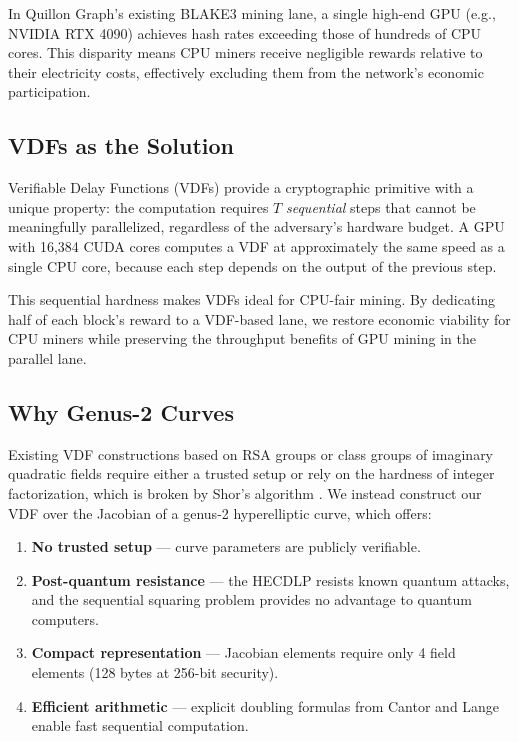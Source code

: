 \documentclass[11pt,a4paper]{article}
\begin{document}
In Quillon Graph's existing BLAKE3 mining lane, a single high-end GPU (e.g., NVIDIA RTX 4090) achieves hash rates exceeding those of hundreds of CPU cores. This disparity means CPU miners receive negligible rewards relative to their electricity costs, effectively excluding them from the network's economic participation.

\subsection{VDFs as the Solution}

Verifiable Delay Functions (VDFs) \cite{boneh2018} provide a cryptographic primitive with a unique property: the computation requires $T$ \emph{sequential} steps that cannot be meaningfully parallelized, regardless of the adversary's hardware budget. A GPU with 16,384 CUDA cores computes a VDF at approximately the same speed as a single CPU core, because each step depends on the output of the previous step.

This sequential hardness makes VDFs ideal for CPU-fair mining. By dedicating half of each block's reward to a VDF-based lane, we restore economic viability for CPU miners while preserving the throughput benefits of GPU mining in the parallel lane.

\subsection{Why Genus-2 Curves}

Existing VDF constructions based on RSA groups \cite{wesolowski2019} or class groups of imaginary quadratic fields require either a trusted setup or rely on the hardness of integer factorization, which is broken by Shor's algorithm \cite{shor1994}. We instead construct our VDF over the Jacobian of a genus-2 hyperelliptic curve, which offers:

\begin{enumerate}
    \item \textbf{No trusted setup} --- curve parameters are publicly verifiable.
    \item \textbf{Post-quantum resistance} --- the HECDLP resists known quantum attacks, and the sequential squaring problem provides no advantage to quantum computers.
    \item \textbf{Compact representation} --- Jacobian elements require only 4 field elements (128 bytes at 256-bit security).
    \item \textbf{Efficient arithmetic} --- explicit doubling formulas from Cantor \cite{cantor1987} and Lange \cite{lange2002} enable fast sequential computation.
\end{enumerate}
\end{document}
